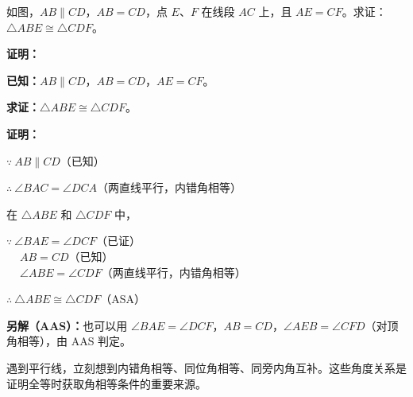 \documentclass[12pt, a4paper]{ctexart}
\begin{document}
\begin{examplebox}
如图，$AB \parallel CD$，$AB = CD$，点 $E$、$F$ 在线段 $AC$ 上，且 $AE = CF$。求证：$\triangle ABE \cong \triangle CDF$。

\begin{center}
\end{center}
\end{examplebox}

\textbf{证明：}

\textbf{已知：}$AB \parallel CD$，$AB = CD$，$AE = CF$。

\textbf{求证：}$\triangle ABE \cong \triangle CDF$。

\textbf{证明：}

$\because\ AB \parallel CD$（已知）

$\therefore\ \angle BAC = \angle DCA$（两直线平行，内错角相等）

在 $\triangle ABE$ 和 $\triangle CDF$ 中，

$\because\ \angle BAE = \angle DCF$（已证）\\
$\quad\ AB = CD$（已知）\\
$\quad\ \angle ABE = \angle CDF$（两直线平行，内错角相等）

$\therefore\ \triangle ABE \cong \triangle CDF$（ASA）

\textbf{另解（AAS）：}也可以用 $\angle BAE = \angle DCF$，$AB = CD$，$\angle AEB = \angle CFD$（对顶角相等），由 AAS 判定。

\begin{tipbox}[方法总结]
遇到平行线，立刻想到内错角相等、同位角相等、同旁内角互补。这些角度关系是证明全等时获取角相等条件的重要来源。
\end{tipbox}
\end{document}
